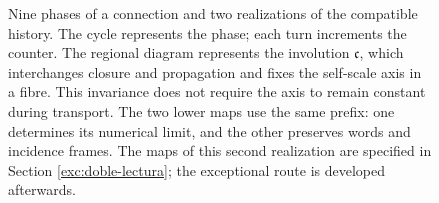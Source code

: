 \begin{figure}[!htbp]
\caption{\fontsize{9}{11}\selectfont Nine phases of a connection and two realizations of the compatible
history. The cycle represents the phase; each turn increments the counter.
The regional diagram represents the involution \(\mathfrak c\), which
interchanges closure and propagation and fixes the self-scale axis in a fibre.
This invariance does not require the axis to remain constant during transport.
The two lower maps use the same prefix: one determines
its numerical limit, and the other preserves words and incidence frames. The
maps of this second realization are specified in Section
\ref{exc:doble-lectura}; the exceptional route is developed afterwards.}
\label{mono-ampl:fig-regional}
\end{figure}
